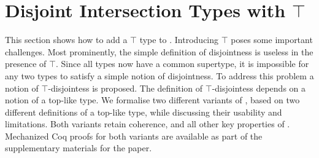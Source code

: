 \section{Disjoint Intersection Types with $\top$}\label{sec:top}

This section shows how to add a $\top$ type to \name.
Introducing $\top$ poses some important challenges. Most prominently,
the simple definition of disjointness is useless in the presence of
$\top$. Since all types now have a common supertype, it is impossible
for any two types to satisfy a simple notion of disjointness. To
address this problem a notion of $\top$-disjointess is proposed.  The
definition of $\top$-disjointess depends on a notion of a top-like
type. We formalise two different variants of \name, based on two different
definitions of a top-like type, while discussing their usability and
limitations. Both variants retain coherence, and all other key
properties of \name. 
Mechanized Coq proofs for both variants are available as part of the 
supplementary materials for the paper.



